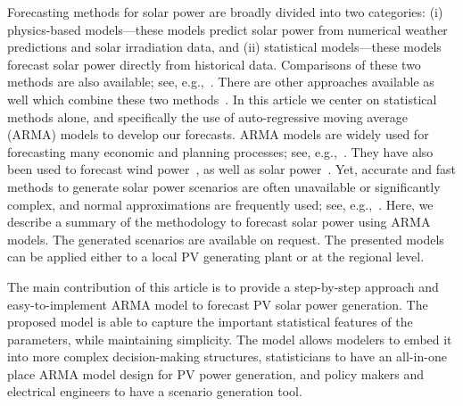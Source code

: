\documentclass[review]{elsarticle}
\begin{document}
Forecasting methods for solar power are broadly divided 
into two categories: (i) physics-based models---these models predict solar 
power 
from numerical weather predictions and solar irradiation data, and (ii) 
statistical models---these 
models forecast 
solar power directly from historical data. Comparisons of these two 
methods are also available; see, 
e.g.,~\cite{huang2010comparative,inman2013solar}. There are other 
approaches available as well which combine these two 
methods~\cite{chen2011online}. 
In this article we center on  statistical  methods alone, and specifically the 
use of auto-regressive moving average (ARMA) 
models to develop our forecasts. ARMA models are widely used for forecasting 
many economic and planning processes; see, e.g.,~\cite{box2008time}. They 
 have also been used to forecast wind power~\cite{brown1984time, 
duran2007short}, as well as solar 
power~\cite{mora1998multiplicative,huang2012solar}.  Yet, accurate and 
fast methods to generate solar power scenarios are often unavailable or 
significantly complex, and normal approximations are frequently used; see, 
e.g.,~\cite{su2014stochastic}. 
Here, 
we describe a summary of the methodology to forecast solar power using 
ARMA models. The generated scenarios are 
available on request.
The presented models can 
be applied either to a local PV generating plant or  at the regional 
level.


The main contribution of this article is to provide a step-by-step approach and 
easy-to-implement ARMA model to forecast PV solar power generation. The 
proposed model is able to capture the important statistical features of the 
parameters, while maintaining simplicity. The model allows modelers to embed
it into more complex decision-making structures, statisticians to have an 
all-in-one place ARMA model design for PV power generation, and policy 
makers and electrical engineers to have a scenario generation tool. 

% 
\end{document}
